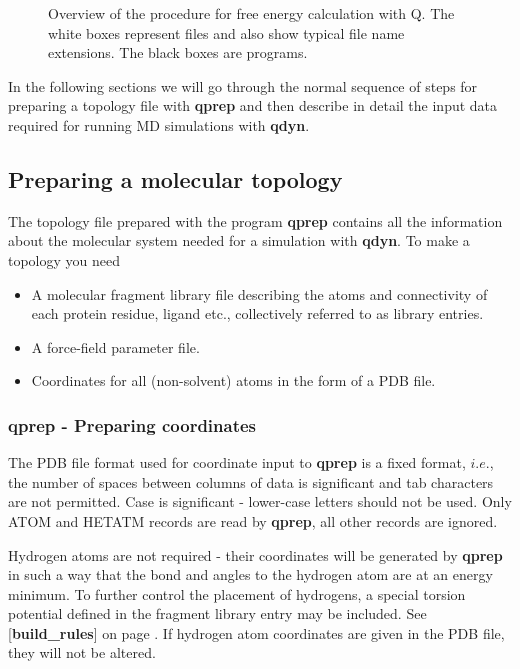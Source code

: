 \documentclass[a4paper,10pt]{article}
\newcommand{\dirfig}{./pictures}
\begin{document}
\begin{figure}[h]
\begin{center}
\caption{Overview of the procedure for free energy calculation
with Q. The white boxes represent files and also show typical file
name extensions. The black boxes are programs.}
\label{fig:overview}
\end{center}
\end{figure}

In the  following sections we will  go through the normal  sequence of
steps  for preparing  a  topology file  with  \textbf{qprep} and  then
describe in detail the input  data required for running MD simulations
with \textbf{qdyn}.

\subsection{Preparing a molecular topology} The topology file
prepared with the program \textbf{qprep} contains all the information about
the molecular system needed for a simulation with \textbf{qdyn}. To make a
topology you need

\begin{itemize}
\item A molecular fragment library file describing the atoms and connectivity
of each protein residue, ligand etc., collectively referred to as
library entries.
\item A force-field parameter file.
\item Coordinates for all (non-solvent) atoms in the form of a PDB file.
\end{itemize}

\subsubsection{\textbf{qprep} - Preparing coordinates}
The  PDB  file  format  \cite{pdb}   used  for  coordinate  input  to
\textbf{qprep} is a fixed format, $i.e.$, the number of spaces between
columns  of   data  is   significant  and   tab  characters   are  not
permitted.  Case is  significant -  lower-case letters  should not  be
used. Only  ATOM and  HETATM records are  read by  \textbf{qprep}, all
other records are ignored.

Hydrogen atoms are not required  - their coordinates will be generated
by  \textbf{qprep} in  such a  way  that the  bond and  angles to  the
hydrogen  atom  are at  an  energy  minimum.  To further  control  the
placement of  hydrogens, a  special torsion  potential defined  in the
fragment library entry may be included. See [\textbf{build\_rules}] on
page \pageref{tab:buildrules}. If hydrogen  atom coordinates are given
in the PDB file, they will not be altered.
\end{document}
